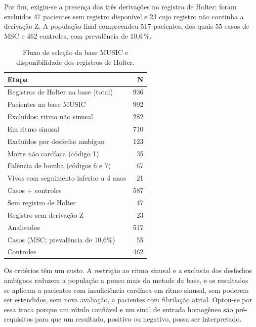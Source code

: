 Por fim, exigiu-se a presença das três derivações no registro de Holter:
foram excluídos 47 pacientes sem registro disponível e 23 cujo registro não
continha a derivação Z. A população final compreendeu 517 pacientes, dos
quais 55 casos de \gls{MSC} e 462 controles, com prevalência de 10,6\,\%.







\begin{table}[htbp]
	\centering
	\caption{Fluxo de seleção da base MUSIC e disponibilidade dos registros de Holter.}
	\label{tab:fluxo-music}
	\begin{tabular}{lr}
		\hline
		\textbf{Etapa}                                & \textbf{N} \\
		\hline
		Registros de Holter na base (total)           & 936        \\
		Pacientes na base MUSIC                       & 992        \\
		\quad Excluídos: ritmo não sinusal            & 282        \\
		Em ritmo sinusal                              & 710        \\
		\quad Excluídos por desfecho ambíguo          & 123        \\
		\qquad Morte não cardíaca (código 1)          & 35         \\
		\qquad Falência de bomba (códigos 6 e 7)      & 67         \\
		\qquad Vivos com seguimento inferior a 4 anos & 21         \\
		Casos + controles                             & 587        \\
		\quad Sem registro de Holter                  & 47         \\
		\quad Registro sem derivação Z                & 23         \\
		Analisados                                    & 517        \\
		\quad Casos (MSC; prevalência de 10,6\%)      & 55         \\
		\quad Controles                               & 462        \\
		\hline
	\end{tabular}
\end{table}

Os critérios têm um custo. A restrição ao ritmo sinusal e a exclusão dos
desfechos ambíguos reduzem a população a pouco mais da metade da base, e os
resultados se aplicam a pacientes com insuficiência cardíaca em ritmo
sinusal, sem poderem ser estendidos, sem nova avaliação, a pacientes com
fibrilação atrial. Optou-se por essa troca porque um rótulo confiável e um
sinal de entrada homogêneo são pré-requisitos para que um resultado,
positivo ou negativo, possa ser interpretado.


